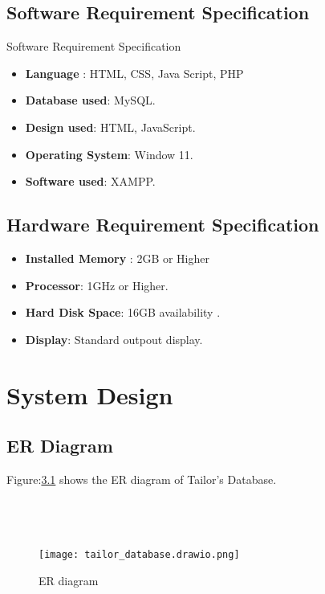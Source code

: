 \documentclass[12pt, letter paper]{report}
\begin{document}
{\section{Software Requirement Specification}
Software Requirement Specification
\begin{itemize}
 \item {\textbf{Language} : HTML, CSS, Java Script, PHP}
 \item {\textbf{Database used}: MySQL}.
 \item {\textbf{Design used}: HTML, JavaScript}.
 \item {\textbf{Operating System}: Window 11}.
 \item {\textbf{Software used}: XAMPP}.
\end{itemize}

\section{Hardware Requirement Specification} 

\begin{itemize}
 \item {\textbf{Installed Memory} : 2GB or Higher}
 \item {\textbf{Processor}: 1GHz or Higher}.
 \item {\textbf{Hard Disk Space}: 16GB availability }.
 \item {\textbf{Display}: Standard outpout display}.
 \
\end{itemize}
\chapter{System Design}
\section{ER Diagram} 
Figure:\ref{fig:tailor_database.drawio.png} shows the ER diagram of Tailor's Database.
\\
\\
\\
\\
\begin{figure}[h]
 \centering
 \texttt{[image: tailor\_database.drawio.png]}
 \caption{ER diagram}
 \label{fig:tailor_database.drawio.png}
\end{figure}
\\
\\
\\
\\
\\
\\
\\
\\
}
\end{document}
